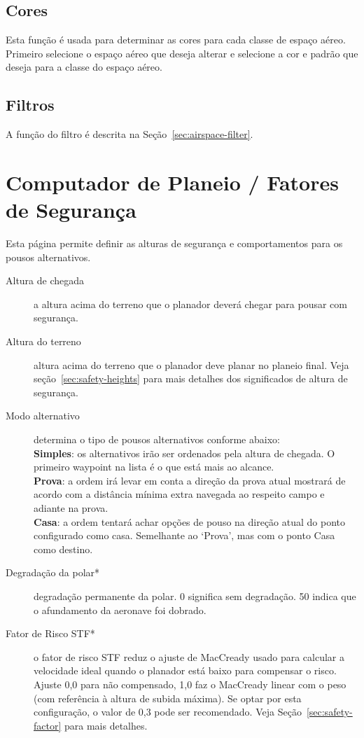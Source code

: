 \subsection*{Cores}
Esta função é usada para determinar as cores para cada classe de espaço aéreo.  Primeiro selecione o espaço aéreo que deseja alterar e selecione a cor e padrão que deseja para a classe do espaço aéreo.

\subsection*{Filtros}
A função do filtro é descrita na Seção~\ref{sec:airspace-filter}.


\section{Computador de Planeio / Fatores de Segurança}

Esta página permite definir as alturas de segurança e comportamentos para os pousos alternativos.

\begin{description}
\item[Altura de chegada]  a altura acima do terreno que o planador deverá chegar para pousar com segurança.
\item[Altura do terreno]  \label{conf:safetyterrain} altura acima do terreno que o planador deve planar no planeio final.  Veja seção~\ref{sec:safety-heights} para mais detalhes dos significados de altura de segurança. \\
\item[Modo alternativo]  \label{conf:alternatesmode} determina o tipo de pousos alternativos conforme abaixo: \\
  {\bf Simples}: os alternativos irão ser ordenados pela altura de chegada.  O primeiro waypoint na lista é o que está mais ao alcance.   \\
  {\bf Prova}: a ordem irá levar em conta a direção da prova atual mostrará de acordo com a distância mínima extra navegada ao respeito campo e adiante na prova. \\
  {\bf Casa}: a ordem tentará achar opções de pouso na direção atual do ponto configurado como casa.  Semelhante ao ‘Prova’, mas com o ponto Casa como destino.
\item[Degradação da polar*]  degradação permanente da polar. 0 significa sem degradação.  50 indica que o afundamento da aeronave foi dobrado.\label{conf:safetyMC} 
\item[Fator de Risco STF*] 
 o fator de risco STF reduz o ajuste de MacCready usado para calcular a velocidade ideal quando o planador está baixo para compensar o risco.  Ajuste 0,0 para não compensado, 1,0 faz o 
 MacCready linear com o peso (com referência à altura de subida máxima).  Se optar por esta configuração, o valor de 0,3 pode ser recomendado.  Veja Seção~\ref{sec:safety-factor} para mais detalhes.
\end{description}


